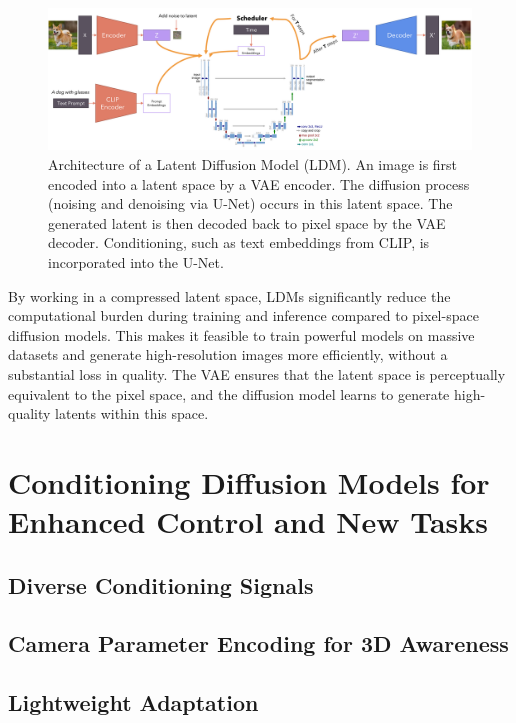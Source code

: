 \begin{figure}[h]
  \centering
  \includegraphics[width=\textwidth]{images/related-work/LDM-detailed.png}
  \caption{Architecture of a Latent Diffusion Model (LDM). An image is first encoded into a latent space by a VAE encoder. The diffusion process (noising and denoising via U-Net) occurs in this latent space. The generated latent is then decoded back to pixel space by the VAE decoder. Conditioning, such as text embeddings from CLIP, is incorporated into the U-Net.}
  \label{fig:ldm-architecture}
\end{figure}

By working in a compressed latent space, LDMs significantly reduce the computational burden during training and inference compared to pixel-space diffusion models. This makes it feasible to train powerful models on massive datasets and generate high-resolution images more efficiently, without a substantial loss in quality. The VAE ensures that the latent space is perceptually equivalent to the pixel space, and the diffusion model learns to generate high-quality latents within this space.

\section{Conditioning Diffusion Models for Enhanced Control and New
Tasks}\label{sec:conditioning-diffusion}

\subsection{Diverse Conditioning Signals}

\subsection{Camera Parameter Encoding for 3D Awareness}

\subsection{Lightweight Adaptation}

